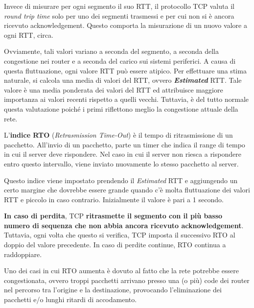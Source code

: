 \documentclass[a4paper]{article}
\begin{document}
	\noindent
	Invece di misurare per ogni segmento il suo RTT, il protocollo TCP valuta il \emph{round trip time} solo per uno dei segmenti trasmessi e per cui non si è ancora ricevuto acknowledgement. Questo comporta la misurazione di un nuovo valore a ogni RTT, circa.\newline
	
	\noindent
	Ovviamente, tali valori variano a seconda del segmento, a seconda della congestione nei router e a seconda del carico sui sistemi periferici. A causa di questa fluttuazione, ogni valore RTT può essere atipico. Per effettuare una stima naturale, si calcola una media di valori del RTT, ovvero \emph{\textbf{Estimated}} RTT. Tale valore è una media ponderata dei valori del RTT ed attribuisce maggiore importanza ai valori recenti rispetto a quelli vecchi. Tuttavia, è del tutto normale questa valutazione poiché i primi riflettono meglio la congestione attuale della rete.\newline
	
	\label{RTO}\noindent
	L'\textcolor{Red3}{\textbf{indice RTO}} (\emph{Retrasmission Time-Out}) è il tempo di ritrasmissione di un pacchetto. All’invio di un pacchetto, parte un timer che indica il range di tempo in cui il server deve rispondere. Nel caso in cui il server non riesca a rispondere entro questo intervallo, viene inviato nuovamente lo stesso pacchetto al server.\newline
	
	\noindent
	Questo indice viene impostato prendendo il \emph{Estimated} RTT e aggiungendo un certo margine che dovrebbe essere grande quando c’è molta fluttuazione dei valori RTT e piccolo in caso contrario. Inizialmente il valore è pari a 1 secondo.\newline
	
	\noindent
	\textbf{In caso di perdita}, TCP \textbf{ritrasmette il segmento con il più basso numero di sequenza che non abbia ancora ricevuto acknowledgement}. Tuttavia, ogni volta che questo si verifica, TCP imposta il successivo RTO al doppio del valore precedente. In caso di perdite continue, RTO continua a raddoppiare.\newline
	
	\noindent
	Uno dei casi in cui RTO aumenta è dovuto al fatto che la rete potrebbe essere congestionata, ovvero troppi pacchetti arrivano presso una (o più) code dei router nel percorso tra l’origine e la destinazione, provocando l’eliminazione dei pacchetti e/o lunghi ritardi di accodamento.
	
	\newpage
	
\end{document}
